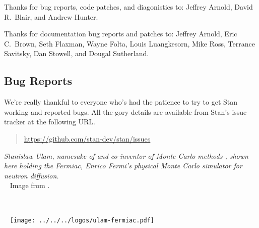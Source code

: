 Thanks for bug reports, code patches, and diagonistics to: Jeffrey Arnold, David
R.~Blair, and Andrew Hunter.

Thanks for documentation bug reports and patches to: Jeffrey Arnold,
Eric C.~Brown, Seth Flaxman, Wayne Folta, Louis Luangkesorn, Mike Ross, Terrance
Savitsky, Dan Stowell, and Dougal Sutherland.


\subsection*{Bug Reports}

We're really thankful to everyone who's had the patience to try
to get Stan working and reported bugs.  All the gory details are
available from Stan's issue tracker at the following URL.
%
\begin{quote}
\url{https://github.com/stan-dev/stan/issues}
\end{quote}




\vfill
\begin{center}
\hfill
\begin{minipage}[b]{2in}
  \footnotesize {\it Stanislaw Ulam, namesake of \Stan and co-inventor
    of Monte Carlo methods \citep{MetropolisUlam:1949}, shown here
    holding the Fermiac, Enrico Fermi's physical Monte Carlo simulator
    for neutron diffusion.}
  \\[3pt] \mbox{ } \hfill
  {\scriptsize Image from \citep{Giesler:2000}.}
\end{minipage} \ \ \ \ \ 
\begin{minipage}[b]{1.5in} \mbox{ } \hfill
  \texttt{[image: ../../../logos/ulam-fermiac.pdf]}
\end{minipage} 
\end{center}
